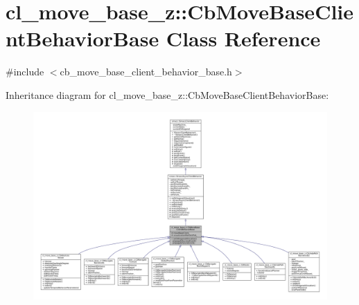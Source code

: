 \hypertarget{classcl__move__base__z_1_1CbMoveBaseClientBehaviorBase}{}\section{cl\+\_\+move\+\_\+base\+\_\+z\+:\+:Cb\+Move\+Base\+Client\+Behavior\+Base Class Reference}
\label{classcl__move__base__z_1_1CbMoveBaseClientBehaviorBase}


{\ttfamily \#include $<$cb\+\_\+move\+\_\+base\+\_\+client\+\_\+behavior\+\_\+base.\+h$>$}



Inheritance diagram for cl\+\_\+move\+\_\+base\+\_\+z\+:\+:Cb\+Move\+Base\+Client\+Behavior\+Base\+:
\nopagebreak
\begin{figure}[H]
\begin{center}
\leavevmode
\includegraphics[width=350pt]{classcl__move__base__z_1_1CbMoveBaseClientBehaviorBase__inherit__graph}
\end{center}
\end{figure}



